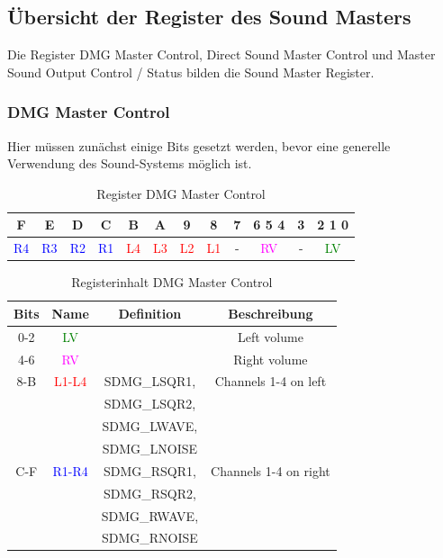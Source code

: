 \documentclass[11pt,a4paper]{scrartcl}
\begin{document}
\subsection{\"Ubersicht der Register des Sound Masters}

Die Register DMG Master Control, Direct Sound Master Control und Master Sound Output Control / Status bilden die Sound Master Register.\\


\subsubsection{DMG Master Control} \label{dmgmastercontrol}

Hier m\"ussen zun\"achst einige Bits gesetzt werden, bevor eine generelle Verwendung des Sound-Systems m\"oglich ist.\\

\begin{table}[h]
	\centering
	\begin{tabular}{| c | c | c | c | c | c | c | c | c | c | c | c |}
	    \hline
	    F & E & D & C & B & A & 9 & 8 & 7 & 6 5 4 & 3 & 2 1 0 \\
	    \hline
	    \textcolor{blue}{R4} & \textcolor{blue}{R3} & \textcolor{blue}{R2} & \textcolor{blue}{R1} & \textcolor{red}{L4} & \textcolor{red}{L3}
	& \textcolor{red}{L2} & \textcolor{red}{L1} & - & \textcolor{magenta}{RV} & - & \textcolor{green}{LV} \\
	    \hline
	\end{tabular}
	\caption{Register DMG Master Control}
	\label{table: DMGMasterControl}
\end{table}
	
\begin{table}[h]
	\centering
	\begin{tabular}{| c | c | c | c |}
	    \hline
	    \textbf{Bits} & \textbf{Name} & \textbf{Definition} & \textbf{Beschreibung} \\
	    \hline
	    0-2 & \textcolor{green}{LV} & & Left volume \\
	    \hline
	    4-6 & \textcolor{magenta}{RV} & & Right volume \\
	    \hline
	    8-B & \textcolor{red}{L1-L4} & SDMG\_LSQR1,  & Channels 1-4 on left \\
	    & & SDMG\_LSQR2, & \\
	    & & SDMG\_LWAVE, & \\
	    & & SDMG\_LNOISE & \\
	    \hline
	    C-F & \textcolor{blue}{R1-R4} & SDMG\_RSQR1, & Channels 1-4 on right \\
	    & & SDMG\_RSQR2, & \\
	    & & SDMG\_RWAVE, & \\
	    & & SDMG\_RNOISE & \\
	    \hline
	\end{tabular}
	\caption{Registerinhalt DMG Master Control}
	\label{table: DMGMasterControlContent}
\end{table}
\end{document}
